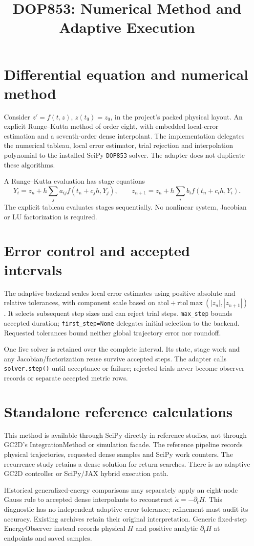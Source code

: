 \documentclass[11pt,a4paper]{article}
\title{DOP853: Numerical Method and Adaptive Execution}
\author{}\date{}\setlength{\emergencystretch}{3em}
\begin{document}
\maketitle
\section{Differential equation and numerical method}
Consider $z'=f(t,z)$, $z(t_0)=z_0$, in the project's packed physical layout.
An explicit Runge--Kutta method of order eight, with embedded local-error estimation and a seventh-order dense interpolant. The implementation delegates the numerical tableau, local error
estimator, trial rejection and interpolation polynomial to the installed SciPy
\texttt{DOP853} solver. The adapter does not duplicate these algorithms.

A Runge--Kutta evaluation has stage equations
\[
Y_i=z_n+h\sum_j a_{ij}f(t_n+c_jh,Y_j),\qquad
z_{n+1}=z_n+h\sum_i b_i f(t_n+c_ih,Y_i).
\]
The explicit tableau evaluates stages sequentially. No nonlinear system, Jacobian or LU factorization is required.
\section{Error control and accepted intervals}
The adaptive backend scales local error estimates using positive absolute and
relative tolerances, with component scale based on
$\mathrm{atol}+\mathrm{rtol}\max(|z_n|,|z_{n+1}|)$. It selects subsequent step
sizes and can reject trial steps. \texttt{max\_step} bounds accepted duration;
\texttt{first\_step=None} delegates initial selection to the backend.
Requested tolerances bound neither global trajectory error nor roundoff.

One live solver is retained over the complete interval. Its state, stage work
and any Jacobian/factorization reuse survive accepted steps. The adapter calls
\texttt{solver.step()} until acceptance or failure; rejected trials never
become observer records or separate accepted metric rows.
\section{Standalone reference calculations}
This method is available through SciPy directly in reference studies, not through
GC2D's IntegrationMethod or simulation facade. The reference pipeline records
physical trajectories, requested dense samples and SciPy work counters.
The recurrence study retains a dense solution for return searches.
There is no adaptive GC2D controller or SciPy/JAX hybrid execution path.

Historical generalized-energy comparisons may separately apply an eight-node
Gauss rule to accepted dense interpolants to reconstruct
$\dot\kappa=-\partial_tH$. This diagnostic has no independent adaptive error
tolerance; refinement must audit its accuracy. Existing archives retain their
original interpretation. Generic fixed-step EnergyObserver instead records
physical $H$ and positive analytic $\partial_tH$ at endpoints and saved samples.
\end{document}
